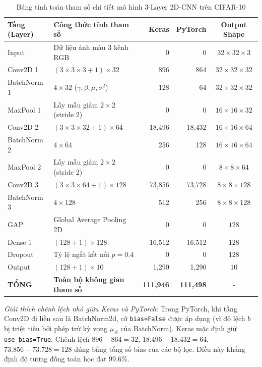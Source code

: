 \documentclass[12pt,a4paper]{report}
\begin{document}
\begin{table}[htbp]
\centering
\caption{Bảng tính toán tham số chi tiết mô hình 3-Layer 2D-CNN trên CIFAR-10}
\label{tab:param_count_3l}
\small
\begin{tabular}{|l|l|r|r|c|}
\hline
\textbf{Tầng (Layer)} & \textbf{Công thức tính tham số} & \textbf{Keras} & \textbf{PyTorch} & \textbf{Output Shape} \\
\hline
Input & Dữ liệu ảnh màu 3 kênh RGB & 0 & 0 & $32 \times 32 \times 3$ \\
Conv2D 1 & $(3 \times 3 \times 3 + 1) \times 32$ & 896 & 864 & $32 \times 32 \times 32$ \\
BatchNorm 1 & $4 \times 32$ ($\gamma, \beta, \mu, \sigma^2$) & 128 & 64 & $32 \times 32 \times 32$ \\
MaxPool 1 & Lấy mẫu giảm $2 \times 2$ (stride 2) & 0 & 0 & $16 \times 16 \times 32$ \\
Conv2D 2 & $(3 \times 3 \times 32 + 1) \times 64$ & 18,496 & 18,432 & $16 \times 16 \times 64$ \\
BatchNorm 2 & $4 \times 64$ & 256 & 128 & $16 \times 16 \times 64$ \\
MaxPool 2 & Lấy mẫu giảm $2 \times 2$ (stride 2) & 0 & 0 & $8 \times 8 \times 64$ \\
Conv2D 3 & $(3 \times 3 \times 64 + 1) \times 128$ & 73,856 & 73,728 & $8 \times 8 \times 128$ \\
BatchNorm 3 & $4 \times 128$ & 512 & 256 & $8 \times 8 \times 128$ \\
GAP & Global Average Pooling 2D & 0 & 0 & $128$ \\
Dense 1 & $(128 + 1) \times 128$ & 16,512 & 16,512 & $128$ \\
Dropout & Tỷ lệ ngắt kết nối $p=0.4$ & 0 & 0 & $128$ \\
Output & $(128 + 1) \times 10$ & 1,290 & 1,290 & $10$ \\
\hline
\textbf{TỔNG} & \textbf{Toàn bộ không gian tham số} & \textbf{111,946} & \textbf{111,498} & - \\
\hline
\end{tabular}
\end{table}

\textit{Giải thích chênh lệch nhỏ giữa Keras và PyTorch}: Trong PyTorch, khi tầng Conv2D đi liền sau là BatchNorm2d, cờ \texttt{bias=False} được áp dụng (vì độ lệch $b$ bị triệt tiêu bởi phép trừ kỳ vọng $\mu_\mathcal{B}$ của BatchNorm). Keras mặc định giữ \texttt{use\_bias=True}. Chênh lệch $896 - 864 = 32$, $18.496 - 18.432 = 64$, $73.856 - 73.728 = 128$ đúng bằng tổng số bias của các bộ lọc. Điều này khẳng định độ tương đồng toán học đạt 99.6\%.
\end{document}
